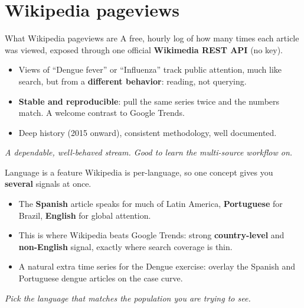 \documentclass[aspectratio=169,11pt]{beamer}
\begin{document}
\section{Wikipedia pageviews}

\begin{frame}{What Wikipedia pageviews are}
  A free, hourly log of how many times each article was viewed, exposed through one official
  \textbf{Wikimedia REST API} (no key).
  \begin{itemize}
    \item Views of ``Dengue fever'' or ``Influenza'' track public attention, much like
          search, but from a \textbf{different behavior}: reading, not querying.
    \item \textbf{Stable and reproducible}: pull the same series twice and the numbers match.
          A welcome contrast to Google Trends.
    \item Deep history (2015 onward), consistent methodology, well documented.
  \end{itemize}
  \vspace{0.3em}
  \begin{center}
    \itshape A dependable, well-behaved stream. Good to learn the multi-source workflow on.
  \end{center}
\end{frame}

\begin{frame}{Language is a feature}
  Wikipedia is per-language, so one concept gives you \textbf{several} signals at once.
  \begin{itemize}
    \item The \textbf{Spanish} article speaks for much of Latin America, \textbf{Portuguese}
          for Brazil, \textbf{English} for global attention.
    \item This is where Wikipedia beats Google Trends: strong \textbf{country-level} and
          \textbf{non-English} signal, exactly where search coverage is thin.
    \item A natural extra time series for the Dengue exercise: overlay the Spanish and
          Portuguese dengue articles on the case curve.
  \end{itemize}
  \vspace{0.3em}
  \begin{center}
    \itshape Pick the language that matches the population you are trying to see.
  \end{center}
\end{frame}
\end{document}
